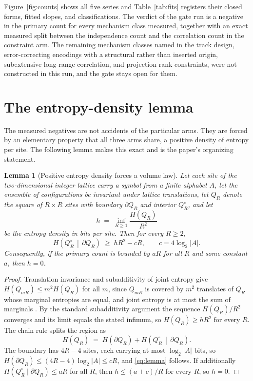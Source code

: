 \documentclass[aps,pre,reprint,nofootinbib]{revtex4-2}
\newtheorem{lemma}{Lemma}
\begin{document}
Figure~\ref{fig:counts} shows all five series and
Table~\ref{tab:fits} registers their closed forms, fitted slopes, and
classifications.  The verdict of the gate run is a negative in the
primary count for every mechanism class measured, together with an exact
measured split between the independence count and the correlation count
in the constraint arm.  The remaining mechanism classes named in the
track design, error-correcting encodings with a structural rather than
inserted origin, subextensive long-range correlation, and projection rank
constraints, were not constructed in this run, and the gate stays open
for them.

\section{The entropy-density lemma}
\label{sec:lemma}

The measured negatives are not accidents of the particular arms.  They
are forced by an elementary property that all three arms share, a
positive density of entropy per site.  The following lemma makes this
exact and is the paper's organizing statement.

\begin{lemma}[Positive entropy density forces a volume law]
\label{lem:density}
Let each site of the two-dimensional integer lattice carry a symbol from
a finite alphabet $A$, let the ensemble of configurations be invariant
under lattice translations, let $Q_R$ denote the square of $R \times R$
sites with boundary $\partial Q_R$ and interior $Q_R^{\circ}$, and let
\begin{equation}
  h \;=\; \inf_{R \ge 1} \frac{H(Q_R)}{R^2}
\end{equation}
be the entropy density in bits per site.  Then for every $R \ge 2$,
\begin{equation}
  H\!\left(Q_R^{\circ} \,\middle|\, \partial Q_R\right)
  \;\ge\; h R^2 - c R,
  \qquad c = 4 \log_2 |A| .
  \label{eq:lemma}
\end{equation}
Consequently, if the primary count is bounded by $aR$ for all $R$ and
some constant $a$, then $h = 0$.
\end{lemma}

\begin{proof}
Translation invariance and subadditivity of joint entropy give
$H(Q_{mR}) \le m^2 H(Q_R)$ for all $m$, since $Q_{mR}$ is covered by
$m^2$ translates of $Q_R$ whose marginal entropies are equal, and joint
entropy is at most the sum of marginals \cite{CoverThomas2006}.  By the
standard subadditivity argument the sequence $H(Q_R)/R^2$ converges and
its limit equals the stated infimum, so $H(Q_R) \ge h R^2$ for every
$R$.  The chain rule splits the region as
\begin{equation}
  H(Q_R) \;=\; H(\partial Q_R)
  + H\!\left(Q_R^{\circ} \,\middle|\, \partial Q_R\right).
\end{equation}
The boundary has $4R - 4$ sites, each carrying at most $\log_2 |A|$
bits, so $H(\partial Q_R) \le (4R-4)\log_2|A| \le cR$, and
\eqref{eq:lemma} follows.  If additionally
$H(Q_R^{\circ} \mid \partial Q_R) \le aR$ for all $R$, then
$h \le (a + c)/R$ for every $R$, so $h = 0$.
\end{proof}
\end{document}
